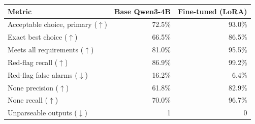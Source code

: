 \begin{tabular}{lrr}
\toprule
Metric & Base Qwen3-4B & Fine-tuned (LoRA) \\
\midrule
Acceptable choice, primary ($\uparrow$) & 72.5\% & 93.0\% \\
Exact best choice ($\uparrow$) & 66.5\% & 86.5\% \\
Meets all requirements ($\uparrow$) & 81.0\% & 95.5\% \\
Red-flag recall ($\uparrow$) & 86.9\% & 99.2\% \\
Red-flag false alarms ($\downarrow$) & 16.2\% & 6.4\% \\
None precision ($\uparrow$) & 61.8\% & 82.9\% \\
None recall ($\uparrow$) & 70.0\% & 96.7\% \\
Unparseable outputs ($\downarrow$) & 1 & 0 \\
\bottomrule
\end{tabular}
